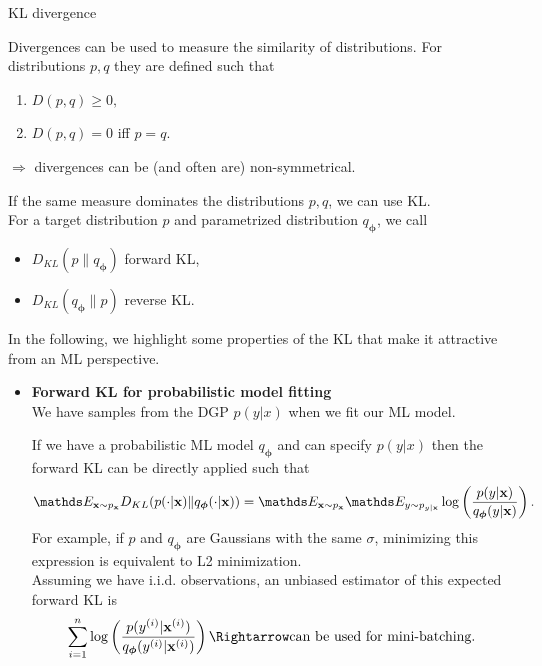 \documentclass[11pt,compress,t,notes=noshow, xcolor=table]{beamer}
\begin{document}
\begin{vbframe}{KL divergence}

Divergences can be used to measure the similarity of distributions. \lz For distributions $p, q$ they are defined such that
\begin{enumerate}
    \item $D(p, q) \geq 0,$
    \item $D(p, q) = 0$ iff $p = q.$
\end{enumerate}
$\Rightarrow$ divergences can be (and often are) non-symmetrical. \\
 \lz
 
If the same measure dominates the distributions $p,q$, we can use KL. \\
For a target distribution $p$ and parametrized distribution $q_{\bm{\phi}}$, we call
\begin{itemize}
    \item $D_{KL}(p \| q_{\bm{\phi}})$ forward KL,
    \item $D_{KL}(q_{\bm{\phi}} \| p)$ reverse KL.
\end{itemize}
\lz
In the following, we highlight some properties of the KL that make it attractive from an ML perspective.

\framebreak

\begin{itemize}
    \item \textbf{Forward KL for probabilistic model fitting}
    \\ We have samples from the DGP $p(y|x)$ when we fit our ML model.
    \\
    \lz
    
    If we have a probabilistic ML model $q_{\bm{\phi}}$ and can specify $p(y|x)$ then the forward KL can be directly applied such that
    $$\E_{\xv \sim p_{\xv}}D_{KL}(p(\cdot|\xv) \| q_{\bm{\phi}}(\cdot|\xv)) = \E_{\xv \sim p_{\xv}}\E_{y \sim p_{y|\xv}}\log\left(\frac{p(y|\xv)}{q_{\bm{\phi}}(y|\xv)}\right).$$
For example, if $p$ and $q_{\bm{\phi}}$ are Gaussians with the same $\sigma$, minimizing this expression is equivalent to L2 minimization. \\
\lz 
Assuming we have i.i.d. observations, an unbiased estimator of this expected forward KL is
$$\sumin \log\left(\frac{p(\yi|\xi)}{q_{\bm{\phi}}(\yi|\xi)}\right) \Rightarrow \text{can be used for mini-batching.} $$


\end{itemize}
\end{vbframe}
\end{document}

